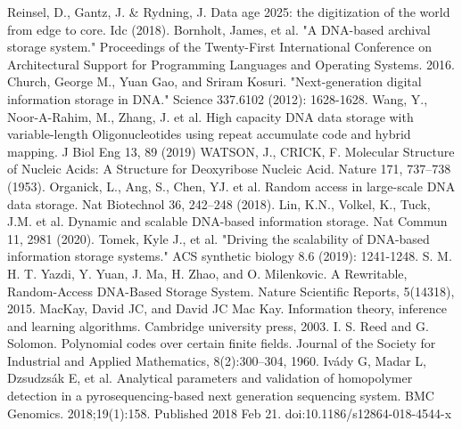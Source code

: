 \documentclass[a4paper,conference]{IEEEtran}
\begin{document}
%
%
%
\begin{thebibliography}{1}

Reinsel, D., Gantz, J. & Rydning, J. Data age 2025: the digitization of the world from edge to core. Idc (2018).
Bornholt, James, et al. "A DNA-based archival storage system." Proceedings of the Twenty-First International Conference on Architectural Support for Programming Languages and Operating Systems. 2016.
Church, George M., Yuan Gao, and Sriram Kosuri. "Next-generation digital information storage in DNA." Science 337.6102 (2012): 1628-1628.
Wang, Y., Noor-A-Rahim, M., Zhang, J. et al. High capacity DNA data storage with variable-length Oligonucleotides using repeat accumulate code and hybrid mapping. J Biol Eng 13, 89 (2019)
WATSON, J., CRICK, F. Molecular Structure of Nucleic Acids: A Structure for Deoxyribose Nucleic Acid. Nature 171, 737–738 (1953).
Organick, L., Ang, S., Chen, YJ. et al. Random access in large-scale DNA data storage. Nat Biotechnol 36, 242–248 (2018).
Lin, K.N., Volkel, K., Tuck, J.M. et al. Dynamic and scalable DNA-based information storage. Nat Commun 11, 2981 (2020).
Tomek, Kyle J., et al. "Driving the scalability of DNA-based information storage systems." ACS synthetic biology 8.6 (2019): 1241-1248.
S. M. H. T. Yazdi, Y. Yuan, J. Ma, H. Zhao, and O. Milenkovic. A Rewritable, Random-Access DNA-Based Storage System. Nature Scientific Reports, 5(14318), 2015.
MacKay, David JC, and David JC Mac Kay. Information theory, inference and learning algorithms. Cambridge university press, 2003.
I. S. Reed and G. Solomon. Polynomial codes over certain finite fields. Journal of the Society for Industrial and Applied Mathematics, 8(2):300–304, 1960.
Ivády G, Madar L, Dzsudzsák E, et al. Analytical parameters and validation of homopolymer detection in a pyrosequencing-based next generation sequencing system. BMC Genomics. 2018;19(1):158. Published 2018 Feb 21. doi:10.1186/s12864-018-4544-x

\end{thebibliography}
\end{document}
